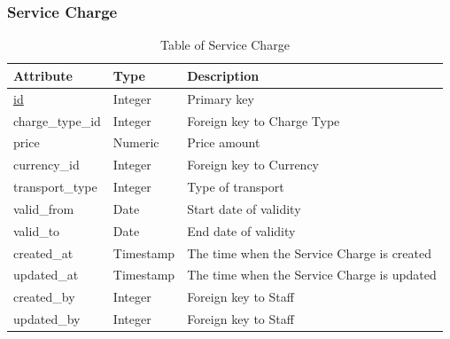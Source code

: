 \subsubsection{Service Charge}
\begin{table}[H]
    \centering
    \begin{tabular}{|p{3cm}|p{2cm}|p{\dimexpr\textwidth-6.8cm}|} %
        \hline
        \rowcolor[HTML]{C0C0C0} 
        \textbf{Attribute} & \textbf{Type} & \textbf{Description} \\ \hline
        \underline{id} & Integer & Primary key \\ \hline
        charge\_type\_id & Integer & Foreign key to Charge Type \\ \hline
        price & Numeric & Price amount \\ \hline
        currency\_id & Integer & Foreign key to Currency \\ \hline
        transport\_type & Integer & Type of transport \\ \hline
        valid\_from & Date & Start date of validity \\ \hline
        valid\_to & Date & End date of validity \\ \hline
        created\_at & Timestamp & The time when the Service Charge is created \\ \hline
        updated\_at & Timestamp & The time when the Service Charge is updated \\ \hline
        created\_by & Integer & Foreign key to Staff \\ \hline
        updated\_by & Integer & Foreign key to Staff \\ \hline
    \end{tabular}
    \caption{Table of Service Charge}
    \label{tab:service-charge-table}
\end{table}

